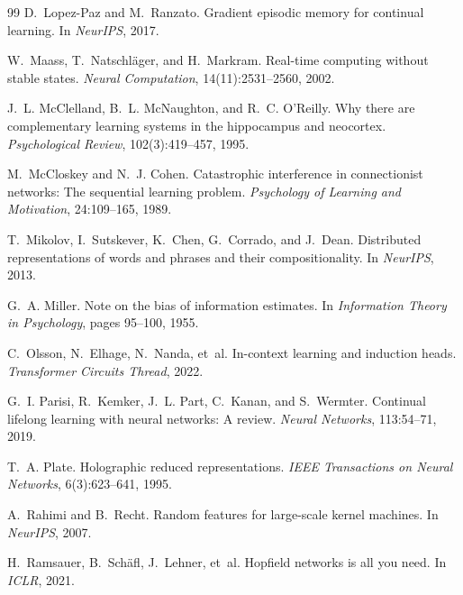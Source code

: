 \documentclass[11pt,a4paper]{article}
\theoremstyle{plain}
\theoremstyle{definition}
\theoremstyle{remark}
\begin{document}
\begin{thebibliography}{99}
D.~Lopez-Paz and M.~Ranzato.
\newblock Gradient episodic memory for continual learning.
\newblock In \emph{NeurIPS}, 2017.

W.~Maass, T.~Natschl\"{a}ger, and H.~Markram.
\newblock Real-time computing without stable states.
\newblock \emph{Neural Computation}, 14(11):2531--2560, 2002.

J.~L. McClelland, B.~L. McNaughton, and R.~C. O'Reilly.
\newblock Why there are complementary learning systems in the hippocampus and
neocortex.
\newblock \emph{Psychological Review}, 102(3):419--457, 1995.

M.~McCloskey and N.~J. Cohen.
\newblock Catastrophic interference in connectionist networks: The sequential
learning problem.
\newblock \emph{Psychology of Learning and Motivation}, 24:109--165, 1989.

T.~Mikolov, I.~Sutskever, K.~Chen, G.~Corrado, and J.~Dean.
\newblock Distributed representations of words and phrases and their
compositionality.
\newblock In \emph{NeurIPS}, 2013.

G.~A. Miller.
\newblock Note on the bias of information estimates.
\newblock In \emph{Information Theory in Psychology}, pages 95--100, 1955.

C.~Olsson, N.~Elhage, N.~Nanda, et~al.
\newblock In-context learning and induction heads.
\newblock \emph{Transformer Circuits Thread}, 2022.

G.~I. Parisi, R.~Kemker, J.~L. Part, C.~Kanan, and S.~Wermter.
\newblock Continual lifelong learning with neural networks: A review.
\newblock \emph{Neural Networks}, 113:54--71, 2019.

T.~A. Plate.
\newblock Holographic reduced representations.
\newblock \emph{IEEE Transactions on Neural Networks}, 6(3):623--641, 1995.

A.~Rahimi and B.~Recht.
\newblock Random features for large-scale kernel machines.
\newblock In \emph{NeurIPS}, 2007.

H.~Ramsauer, B.~Sch\"{a}fl, J.~Lehner, et~al.
\newblock Hopfield networks is all you need.
\newblock In \emph{ICLR}, 2021.


\end{thebibliography}
\end{document}
